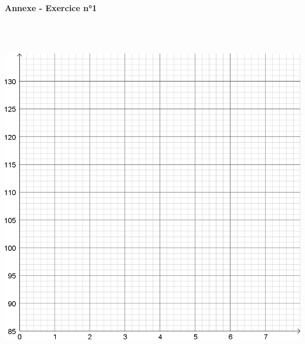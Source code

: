 \newpage~\newpage{}
~\\~
\begin{center}
	\textbf{\LARGE{Annexe - Exercice n°1}}
\end{center}
~\\~
\begin{center}\includegraphics[width=18.5cm]{img/annexe}\end{center}

